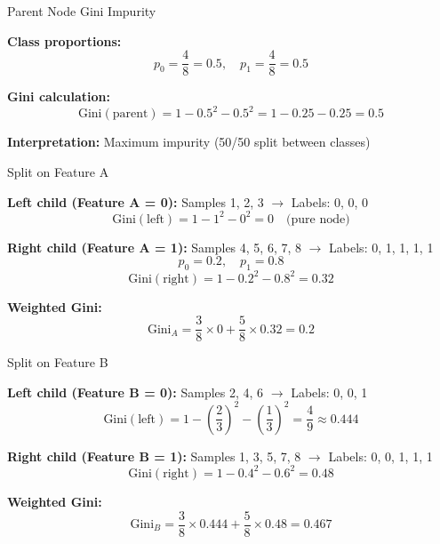 \documentclass{beamer}
\begin{document}
\begin{frame}{Parent Node Gini Impurity}

\textbf{Class proportions:}
\[
p_0 = \frac{4}{8} = 0.5, \quad p_1 = \frac{4}{8} = 0.5
\]

\pause
\vspace{1em}

\textbf{Gini calculation:}
\[
\text{Gini}(\text{parent}) = 1 - 0.5^2 - 0.5^2 = 1 - 0.25 - 0.25 = 0.5
\]

\pause
\vspace{1em}

\textbf{Interpretation:} Maximum impurity (50/50 split between classes)

\end{frame}

\begin{frame}{Split on Feature A}

\textbf{Left child (Feature A = 0):} Samples 1, 2, 3 $\rightarrow$ Labels: 0, 0, 0
\[
\text{Gini}(\text{left}) = 1 - 1^2 - 0^2 = 0 \quad \text{(pure node)}
\]

\pause
\vspace{0.5em}

\textbf{Right child (Feature A = 1):} Samples 4, 5, 6, 7, 8 $\rightarrow$ Labels: 0, 1, 1, 1, 1
\[
p_0 = 0.2, \quad p_1 = 0.8
\]
\[
\text{Gini}(\text{right}) = 1 - 0.2^2 - 0.8^2 = 0.32
\]

\pause
\vspace{0.5em}

\textbf{Weighted Gini:}
\[
\text{Gini}_A = \frac{3}{8} \times 0 + \frac{5}{8} \times 0.32 = 0.2
\]

\end{frame}

\begin{frame}{Split on Feature B}

\textbf{Left child (Feature B = 0):} Samples 2, 4, 6 $\rightarrow$ Labels: 0, 0, 1
\[
\text{Gini}(\text{left}) = 1 - \left(\frac{2}{3}\right)^2 - \left(\frac{1}{3}\right)^2 = \frac{4}{9} \approx 0.444
\]

\pause
\vspace{0.5em}

\textbf{Right child (Feature B = 1):} Samples 1, 3, 5, 7, 8 $\rightarrow$ Labels: 0, 0, 1, 1, 1
\[
\text{Gini}(\text{right}) = 1 - 0.4^2 - 0.6^2 = 0.48
\]

\pause
\vspace{0.5em}

\textbf{Weighted Gini:}
\[
\text{Gini}_B = \frac{3}{8} \times 0.444 + \frac{5}{8} \times 0.48 = 0.467
\]

\end{frame}
\end{document}
